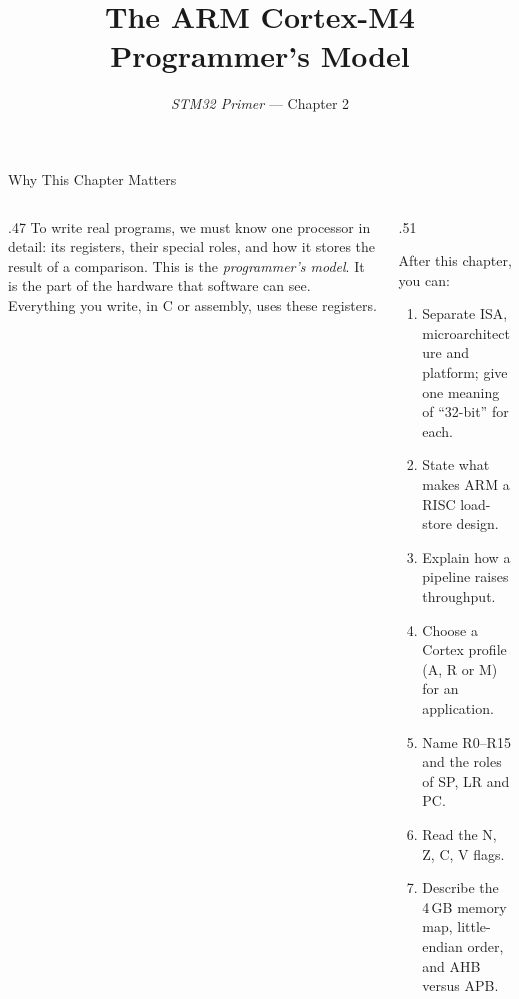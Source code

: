 \documentclass[9pt,aspectratio=169,xcolor=table]{beamer}
\title{The ARM Cortex-M4 Programmer's Model}
\subtitle{\emph{STM32 Primer} --- Chapter 2}
\begin{document}
\titlepage
\begin{frame}{Why This Chapter Matters}
    \begin{columns}[T]
    \begin{column}{.47\textwidth}
        {\normalsize To write real programs, we must know one processor in detail: its registers, their special roles, and how it stores the result of a comparison. This is the \emph{programmer's model}. It is the part of the hardware that software can see. Everything you write, in C or assembly, uses these registers.}
    \end{column}
    \begin{column}{.51\textwidth}
        \begin{block}{After this chapter, you can:}
        {\small
        \begin{enumerate}\itemsep2pt
            \item Separate ISA, microarchitecture and platform; give one meaning of ``32-bit'' for each.
            \item State what makes ARM a RISC load-store design.
            \item Explain how a pipeline raises throughput.
            \item Choose a Cortex profile (A, R or M) for an application.
            \item Name R0--R15 and the roles of SP, LR and PC.
            \item Read the N, Z, C, V flags.
            \item Describe the 4\,GB memory map, little-endian order, and AHB versus APB.
        \end{enumerate}}
        \end{block}
    \end{column}
    \end{columns}
\end{frame}
\end{document}
